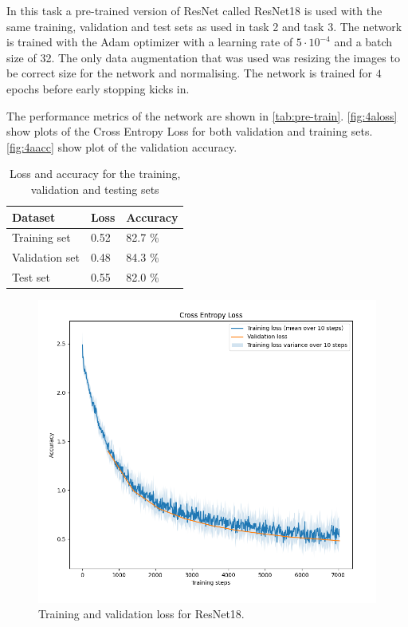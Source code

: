 \documentclass{article}
\begin{document}
In this task a pre-trained version of ResNet called ResNet18 is used with the same training, validation and test sets as used in task 2 and task 3. The network is trained with the Adam optimizer with a learning rate of $5 \cdot 10 ^{-4}$ and a batch size of 32. The only data augmentation that was used was resizing the images to be correct size for the network and normalising. The network is trained for $4$ epochs before early stopping kicks in. 

The performance metrics of the network are shown in \autoref{tab:pre-train}. \autoref{fig:4aloss} show plots of the Cross Entropy Loss for both validation and training sets. \autoref{fig:4aacc} show plot of the validation accuracy.

\begin{table}[H]
\centering
\caption{Loss and accuracy for the training, validation and testing sets}
\label{tab:pre-train}
\begin{tabular}{|l|l|l|}
\hline
\textbf{Dataset} & \textbf{Loss} & \textbf{Accuracy} \\ \hline
Training set     & 0.52          & 82.7 \%           \\ \hline
Validation set   & 0.48          & 84.3 \%           \\ \hline
Test set      & 0.55          & 82.0 \%           \\ \hline
\end{tabular}
\end{table}

\begin{figure}[H]
    \centering
    \includegraphics[width=\textwidth]{Assignments/Assignment_3/plots/task4a_plot_loss.png}
    \caption{Training and validation loss for ResNet18.}
    \label{fig:4aloss}
\end{figure}
\end{document}
